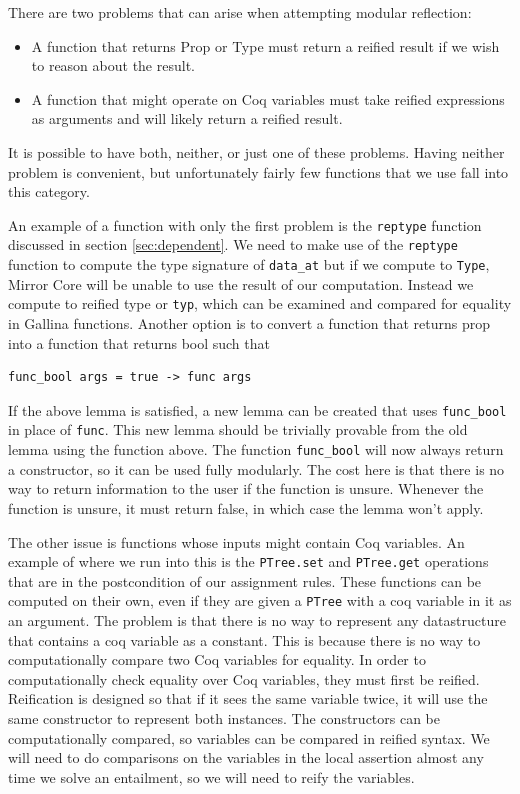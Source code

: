 \documentclass{puthesis}
\begin{document}
There are two problems that can arise when attempting modular reflection:

\begin{itemize}
\item A function that returns Prop or Type must return a reified
  result if we wish to reason about the result.
\item A function that might operate on Coq variables must take reified
  expressions as arguments and will likely return a reified result.
\end{itemize}

It is possible to have both, neither, or just one of these problems.
Having neither problem is convenient, but unfortunately fairly few
functions that we use fall into this category. 

An example of a function with only the first problem is the
\lstinline|reptype| function discussed in section
\ref{sec:dependent}. We need to make use of the \lstinline|reptype|
function to compute the type signature of \lstinline|data_at| but if we
compute to \lstinline|Type|, Mirror Core will be unable to use the
result of our computation. Instead we compute to reified type or
\lstinline|typ|, which can be examined and compared for equality in
Gallina functions. Another option is to convert a function that
returns prop into a function that returns bool such that

\begin{lstlisting}
func_bool args = true -> func args
\end{lstlisting}

If the above lemma is satisfied, a new lemma can be created that uses
\lstinline|func_bool| in place of \lstinline|func|. This new lemma
should be trivially provable from the old lemma using the function
above. The function \lstinline|func_bool| will now always return a
constructor, so it can be used fully modularly. The cost here is that
there is no way to return information to the user if the function is
unsure. Whenever the function is unsure, it must return false, in
which case the lemma won't apply. 

The other issue is functions whose inputs might contain Coq
variables. An example of where we run into this is the
\lstinline|PTree.set| and \lstinline|PTree.get| operations that are in
the postcondition of our assignment rules. These functions can be
computed on their own, even if they are given a \lstinline|PTree| with
a coq variable in it as an argument. The problem is that there is no
way to represent any datastructure that contains a coq variable as a
constant. This is because there is no way to computationally compare
two Coq variables for equality. In order to computationally check
equality over Coq variables, they must first be reified.  Reification
is designed so that if it sees the same variable twice, it will use
the same constructor to represent both instances. The constructors can
be computationally compared, so variables can be compared in reified
syntax.  We will need to do comparisons on the variables in the local
assertion almost any time we solve an entailment, so we will need to
reify the variables.
\end{document}
